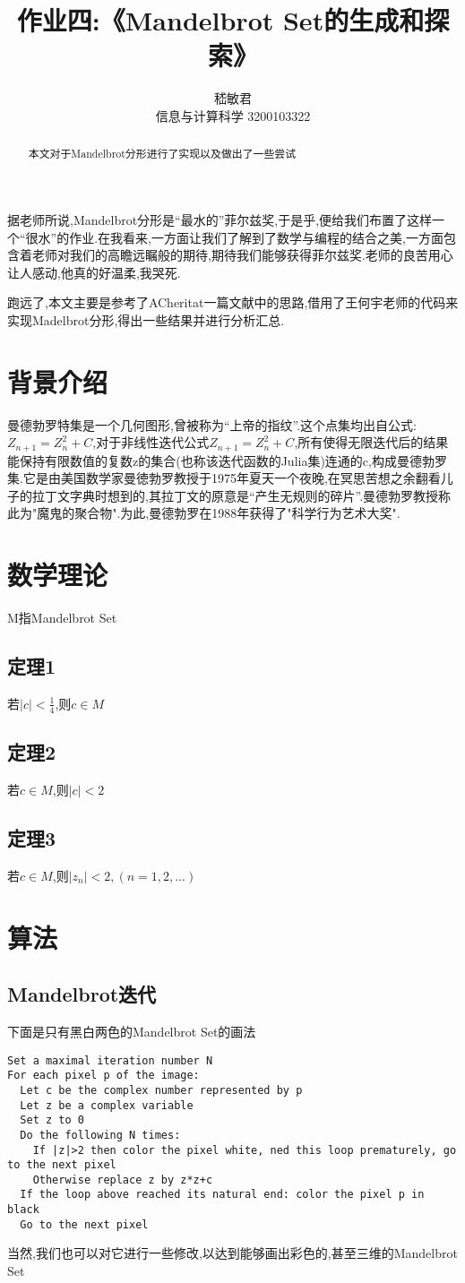 \documentclass[a4paper]{ctexart}
\title{作业四:《Mandelbrot Set的生成和探索》}
\author{嵇敏君 \\信息与计算科学 3200103322 }
\begin{document}
\maketitle

\begin{abstract}
  本文对于Mandelbrot分形进行了实现以及做出了一些尝试
\end{abstract}

据老师所说,Mandelbrot分形是“最水的”菲尔兹奖,于是乎,便给我们布置了这样一个“很水”的作业.在我看来,一方面让我们了解到了数学与编程的结合之美,一方面包含着老师对我们的高瞻远瞩般的期待,期待我们能够获得菲尔兹奖.老师的良苦用心让人感动,他真的好温柔,我哭死.

跑远了,本文主要是参考了ACheritat一篇文献\cite{ACheritat}中的思路,借用了王何宇老师的代码来实现Madelbrot分形,得出一些结果并进行分析汇总.

\section{背景介绍}
曼德勃罗特集是一个几何图形,曾被称为“上帝的指纹”.这个点集均出自公式:$Z_{n+1}=Z^2_n+C$,对于非线性迭代公式$Z_{n+1}=Z^2_n+C$,所有使得无限迭代后的结果能保持有限数值的复数z的集合(也称该迭代函数的Julia集)连通的c,构成曼德勃罗集.它是由美国数学家曼徳勃罗教授于1975年夏天一个夜晚,在冥思苦想之余翻看儿子的拉丁文字典时想到的,其拉丁文的原意是“产生无规则的碎片”.曼德勃罗教授称此为"魔鬼的聚合物".为此,曼德勃罗在1988年获得了"科学行为艺术大奖".
\section{数学理论}
M指Mandelbrot Set
\subsection{定理1}
若$|c|<\frac{1}{4}$,则$c \in M$
\subsection{定理2}
若$c \in M$,则$|c|<2$
\subsection{定理3}
若$c \in M$,则$|z_n|<2,(n=1,2,...)$
\section{算法}
\subsection{Mandelbrot迭代}
下面是只有黑白两色的Mandelbrot Set的画法
\begin{verbatim}
Set a maximal iteration number N
For each pixel p of the image:
  Let c be the complex number represented by p
  Let z be a complex variable
  Set z to 0
  Do the following N times:
    If |z|>2 then color the pixel white, ned this loop prematurely, go to the next pixel
    Otherwise replace z by z*z+c
  If the loop above reached its natural end: color the pixel p in black
  Go to the next pixel
\end{verbatim}
当然,我们也可以对它进行一些修改,以达到能够画出彩色的,甚至三维的Mandelbrot Set
\end{document}
